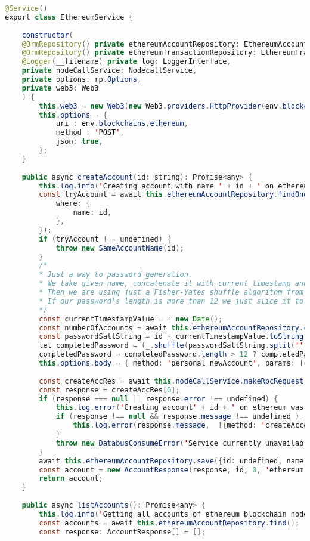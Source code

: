 \begin{lstlisting}[language=java]
@Service()
export class EthereumService {
	
	constructor(
	@OrmRepository() private ethereumAccountRepository: EthereumAccountRepository,
	@OrmRepository() private ethereumTransactionRepository: EthereumTransactionRepository,
	@Logger(__filename) private log: LoggerInterface,
	private nodeCallService: NodecallService,
	private options: rp.Options,
	private web3: Web3
	) {
		this.web3 = new Web3(new Web3.providers.HttpProvider(env.blockchains.ethereum));
		this.options = {
			uri : env.blockchains.ethereum,
			method : 'POST',
			json: true,
		};
	}
	
	public async createAccount(id: string): Promise<any> {
		this.log.info('Creating account with name ' + id + ' on ethereum blockchain');
		const tryAccount = await this.ethereumAccountRepository.findOne({
			where: {
				name: id,
			},
		});
		if (tryAccount !== undefined) {
			throw new SameAccountName(id);
		}
		/*
		* Just a way to password generation.
		* We take given name, concatenate it with current timestamp and number of existing accounts
		* Then we are using just a Fisher-Yates shuffle algorithm from underscore.js library.
		* If our password's length is more than 12 we just slice it to 12.
		*/
		const currentTimestampValue = + new Date();
		const numberOfAccounts = await this.ethereumAccountRepository.count();
		const passwordSaltString = id + currentTimestampValue.toString() + numberOfAccounts;
		let completedPassword = (_.shuffle(passwordSaltString.split(''))).join('');
		completedPassword = completedPassword.length > 12 ? completedPassword.slice(0, 13) : completedPassword;
		this.options.body = { method: 'personal_newAccount', params: [completedPassword], id: '777' };
		
		const createAccRes = await this.nodeCallService.makeRpcRequest(this.options);
		const response = createAccRes[0];
		if (response === null || response.error !== undefined) {
			this.log.error('Creating account' + id + ' on ethereum was fault', [{method: 'createAccount'}]);
			if (response !== null && response.message !== undefined ) {
				this.log.error(response.message,  [{method: 'createAccount'}]);
			}
			throw new DatabusConsumeError('Service currently unavailable');
		}
		await this.ethereumAccountRepository.save({id: undefined, name: id, address: response, password: completedPassword});
		const account = new AccountResponse(response, id, 0, 'ethereum');
		return account;
	}
	
	public async listAccounts(): Promise<any> {
		this.log.info('Getting all accounts of ethereum blockchain node');
		const accounts = await this.ethereumAccountRepository.find();
		const response: AccountResponse[] = [];
		

\end{lstlisting}
